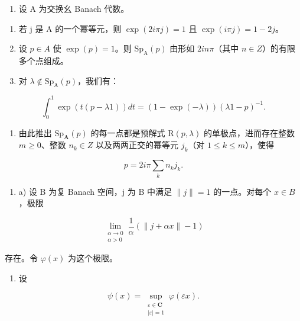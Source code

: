 \begin{enumerate}
\def\labelenumi{\arabic{enumi})}
\setcounter{enumi}{5}
\tightlist
\item
  设 A 为交换幺 Banach 代数。
\end{enumerate}

\begin{enumerate}
\def\labelenumi{\alph{enumi})}
\item
  若 j 是 A 的一个幂等元，则 \(\exp(2i\pi j)=1\) 且 \(\exp(i\pi j)=1-2j\)。
\item
  设 \(p \in A\) 使 \(\exp(p) = 1\)。则 \(\mathrm{Sp}_{\mathrm{A}}(p)\) 由形如 \(2in\pi\)（其中 \(n \in Z\)）的有限多个点组成。
\item
  对 \(\lambda \notin \mathrm{Sp}_{\mathrm{A}}(p)\)，我们有：
\end{enumerate}

\[
\int_ {0} ^ {1} \exp (t (p - \lambda 1)) d t = (1 - \exp (- \lambda)) (\lambda 1 - p) ^ {- 1}.
\]

\begin{enumerate}
\def\labelenumi{\alph{enumi})}
\setcounter{enumi}{3}
\tightlist
\item
  由此推出 \(\mathrm{Sp}_{\mathbf{A}}(p)\) 的每一点都是预解式 \(\mathrm{R}(p,\lambda)\) 的单极点，进而存在整数 \(m \geqslant 0\)、整数 \(n_{k} \in Z\) 以及两两正交的幂等元 \(j_{k}\)（对 \(1 \leqslant k \leqslant m\)），使得
\end{enumerate}

\[
p = 2 i \pi \sum_ {k} n _ {k} j _ {k}.
\]

\begin{enumerate}
\def\labelenumi{¶ \arabic{enumi})}
\setcounter{enumi}{6}
\tightlist
\item
  a) 设 B 为复 Banach 空间，j 为 B 中满足 \(\|j\| = 1\) 的一点。对每个 \(x \in B\)，极限
\end{enumerate}

\[
\lim_{\substack{\alpha \to 0\\ \alpha >0}}\frac{1}{\alpha} (\| j + \alpha x\| -1)
\]

存在。令 \(\varphi(x)\) 为这个极限。

\begin{enumerate}
\def\labelenumi{\alph{enumi})}
\setcounter{enumi}{1}
\tightlist
\item
  设
\end{enumerate}

\[
\psi (x) = \sup_{\substack{\varepsilon \in \mathbf{C}\\ |\varepsilon | = 1}}\varphi (\varepsilon x).
\]

